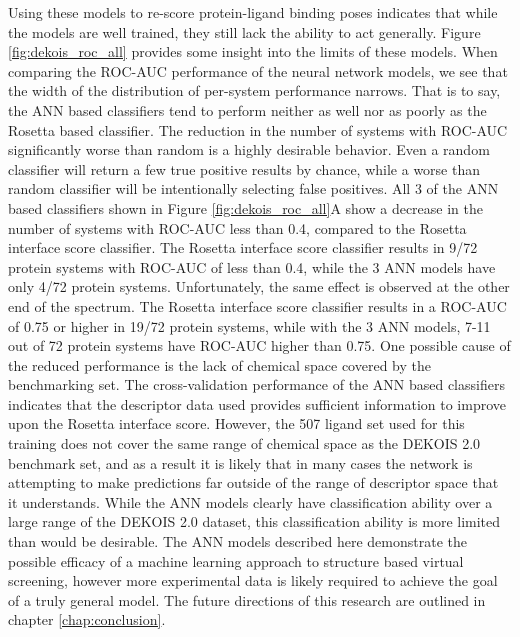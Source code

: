 Using these models to re-score protein-ligand binding poses indicates that while the models are well trained, they still lack the ability to act generally. Figure \ref{fig:dekois_roc_all} provides some insight into the limits of these models.
When comparing the \ac{ROC-AUC} performance of the neural network models, we see that the width of the distribution of per-system performance narrows.
That is to say, the \ac{ANN} based classifiers tend to perform neither as well nor as poorly as the Rosetta based classifier.
The reduction in the number of systems with \ac{ROC-AUC} significantly worse than random is a highly desirable behavior.
Even a random classifier will return a few true positive results by chance, while a worse than random classifier will be intentionally selecting false positives.
All 3 of the \ac{ANN} based classifiers shown in Figure \ref{fig:dekois_roc_all}A show a decrease in the number of systems with \ac{ROC-AUC} less than 0.4, compared to the Rosetta interface score classifier.
The Rosetta interface score classifier results in 9/72 protein systems with \ac{ROC-AUC} of less than 0.4, while the 3 \ac{ANN} models have only 4/72 protein systems.
Unfortunately, the same effect is observed at the other end of the spectrum.
The Rosetta interface score classifier results in a \ac{ROC-AUC} of 0.75 or higher in 19/72 protein systems, while with the 3 \ac{ANN} models, 7-11 out of 72 protein systems have \ac{ROC-AUC} higher than 0.75. 
One possible cause of the reduced performance is the lack of chemical space covered by the benchmarking set.
The cross-validation performance of the \ac{ANN} based classifiers indicates that the descriptor data used provides sufficient information to improve upon the Rosetta interface score.
However, the 507 ligand set used for this training does not cover the same range of chemical space as the DEKOIS 2.0 benchmark set, and as a result it is likely that in many cases the network is attempting to make predictions far outside of the range of descriptor space that it understands.
While the \ac{ANN} models clearly have classification ability over a large range of the DEKOIS 2.0 dataset, this classification ability is more limited than would be desirable.
The \ac{ANN} models described here demonstrate the possible efficacy of a machine learning approach to structure based virtual screening, however more experimental data is likely required to achieve the goal of a truly general model.
The future directions of this research are outlined in chapter \ref{chap:conclusion}.